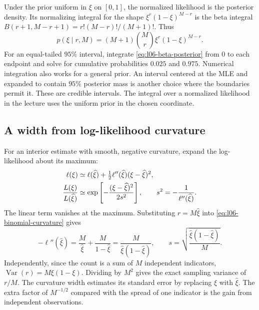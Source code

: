 Under the prior uniform in $\xi$ on $[0,1]$, the normalized likelihood is the posterior density. Its normalizing integral for the shape $\xi^r(1-\xi)^{M-r}$ is the beta integral $B(r+1,M-r+1)=r!(M-r)!/(M+1)!$. Thus
\begin{equation}
 p(\xi\mid r,M)
 =(M+1)\binom{M}{r}\xi^r(1-\xi)^{M-r}.
 \label{eq:l06-beta-posterior}
\end{equation}
For an equal-tailed $95\%$ interval, integrate \eqref{eq:l06-beta-posterior} from $0$ to each endpoint and solve for cumulative probabilities $0.025$ and $0.975$. Numerical integration also works for a general prior. An interval centered at the MLE and expanded to contain $95\%$ posterior mass is another choice where the boundaries permit it. These are credible intervals. The integral over a normalized likelihood in the lecture uses the uniform prior in the chosen coordinate.

\subsection{A width from log-likelihood curvature}
\label{subsec:l06-curvature}

For an interior estimate with smooth, negative curvature, expand the log-likelihood about its maximum:
\begin{align}
 \ell(\xi)&\simeq\ell(\widehat\xi)
       +\tfrac12\ell''(\widehat\xi)(\xi-\widehat\xi)^2,
       \notag\\
 \frac{L(\xi)}{L(\widehat\xi)}
 &\simeq \exp\left[-\frac{(\xi-\widehat\xi)^2}{2s^2}\right],
 \qquad s^2=-\frac{1}{\ell''(\widehat\xi)}.
 \label{eq:l06-curvature}
\end{align}
The linear term vanishes at the maximum. Substituting $r=M\widehat\xi$ into \eqref{eq:l06-binomial-curvature} gives
\begin{equation}
 -\ell''(\widehat\xi)=\frac{M}{\widehat\xi}
    +\frac{M}{1-\widehat\xi}
    =\frac{M}{\widehat\xi(1-\widehat\xi)},\qquad
 \boxed{s=\sqrt{\frac{\widehat\xi(1-\widehat\xi)}{M}}.}
 \label{eq:l06-binomial-sem}
\end{equation}
Independently, since the count is a sum of $M$ independent indicators, $\operatorname{Var}(r)=M\xi(1-\xi)$. Dividing by $M^2$ gives the exact sampling variance of $r/M$. The curvature width estimates its standard error by replacing $\xi$ with $\widehat\xi$. The extra factor of $M^{-1/2}$ compared with the spread of one indicator is the gain from independent observations.


